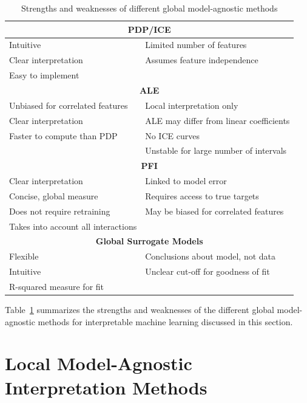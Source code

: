 \begin{table}
\centering
\renewcommand{\arraystretch}{1.25}
\begin{tabular}{l|l} \hline
\multicolumn{2}{c}{\textbf{PDP/ICE}} \\ \hline
Intuitive & Limited number of features \\
Clear interpretation & Assumes feature independence \\
Easy to implement & \\ \hline
\multicolumn{2}{c}{\textbf{ALE}} \\ \hline
Unbiased for correlated features & Local interpretation only\\
Clear interpretation & ALE may differ from linear coefficients\\ 
Faster to compute than PDP & No ICE curves \\
& Unstable for large number of intervals \\  \hline
\multicolumn{2}{c}{\textbf{PFI}} \\ \hline
Clear interpretation & Linked to model error \\
Concise, global measure & Requires access to true targets \\
Does not require retraining & May be biased for correlated features \\
Takes into account all interactions & \\ \hline
\multicolumn{2}{c}{\textbf{Global Surrogate Models}} \\ \hline
Flexible & Conclusions about model, not data \\ 
Intuitive & Unclear cut-off for goodness of fit \\
R-squared measure for fit & \\ \hline
\end{tabular}
\caption[Strengths and weaknesses of global model-agnostic methods]{Strengths and weaknesses of different global model-agnostic methods}
\label{tab:summaryglobalmethods}
\end{table}

Table~\ref{tab:summaryglobalmethods} summarizes the strengths and weaknesses of the different global model-agnostic methods for interpretable machine learning discussed in this section.

\section{Local Model-Agnostic Interpretation Methods}

